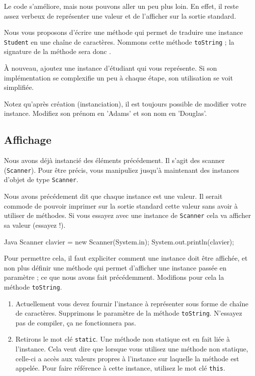 \documentclass[a4paper,11pt]{style-esi/td}
\begin{document}
	\bigskip

	Le code s'améliore, mais nous pouvons aller un peu plus loin. En effet, il reste assez verbeux de représenter une valeur et de l'afficher sur la sortie standard.

	Nous vous proposons d'écrire une méthode qui permet de \og traduire\fg{} une
	instance \texttt{Student} en une chaîne de caractères. Nommons cette
	méthode \texttt{toString} ; la signature de la méthode sera donc
	.


	À nouveau, ajoutez une instance d'étudiant qui vous représente. Si son implémentation se complexifie un peu à chaque étape, son utilisation se voit simplifiée.

	Notez qu'après création (instanciation), il est toujours possible de modifier votre instance. Modifiez son prénom en 'Adams' et son nom en 'Douglas'.


	\subsection{Affichage}

	Nous avons déjà instancié des éléments précédement. Il s'agit des scanner
	(\texttt{Scanner}).  Pour être précis, vous manipuliez jusqu'à maintenant
	des instances d'objet de type \texttt{Scanner}.

	Nous avons précédement dit que chaque instance est une valeur. Il serait commode de pouvoir imprimer sur la sortie standard cette valeur sans avoir à utiliser de méthodes. Si vous essayez avec une instance de \texttt{Scanner} cela va afficher sa valeur (essayez !).
	\begin{Code}{Java}
		Scanner clavier = new Scanner(System.in);
		System.out.println(clavier);
	\end{Code}

	Pour permettre cela, il faut expliciter comment une instance doit être affichée, et non plus définir une méthode qui permet d'afficher une instance passée en paramètre ; ce que nous avons fait précédemment. Modifions pour cela la méthode \texttt{toString}. 
	\begin{enumerate}
		\item Actuellement vous devez fournir l'instance à représenter sous forme de chaîne de caractères. Supprimons le paramètre de la méthode \texttt{toString}. N'essayez pas de compiler, ça ne fonctionnera pas.
		\item Retirons le mot clé \texttt{static}. Une méthode non statique est en fait liée à l'instance. Cela veut dire que lorsque vous utilisez une méthode non statique, celle-ci a accès aux valeurs propres à l'instance sur laquelle la méthode est appelée. Pour faire référence à cette instance, utilisez le mot clé \texttt{this}.
	\end{enumerate} 
\end{document}
